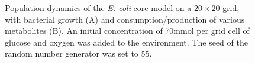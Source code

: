 \begin{figure}[h!]
  \centering
  \caption{Population dynamics of the \emph{E. coli} core model on a $20\times20$ grid, with bacterial growth (A) and consumption/production of various metabolites (B). An initial concentration of 70\;mmol per grid cell of glucose and oxygen was added to the environment. The seed of the random number generator was set to 55.}
\label{fig:ecoresg}
\end{figure}


